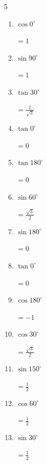 \begin{multicols}{5}
\begin{enumerate}
        $\displaystyle =-\sqrt{3}$

  \item $\displaystyle \cos{0^\circ}$

        $\displaystyle =1$

  \item $\displaystyle \sin{90^\circ}$

        $\displaystyle =1$

\columnbreak %

  \item $\displaystyle \tan{30^\circ}$

        $\displaystyle =\frac{1}{\sqrt{3}}$

  \item $\displaystyle \tan{0^\circ}$

        $\displaystyle =0$

  \item $\displaystyle \tan{180^\circ}$

        $\displaystyle =0$

  \item $\displaystyle \sin{60^\circ}$

        $\displaystyle =\frac{\sqrt{3}}{2}$

  \item $\displaystyle \sin{180^\circ}$

        $\displaystyle =0$

  \item $\displaystyle \tan{0^\circ}$

        $\displaystyle =0$

  \item $\displaystyle \cos{180^\circ}$

        $\displaystyle =-1$

  \item $\displaystyle \cos{30^\circ}$

        $\displaystyle =\frac{\sqrt{3}}{2}$

  \item $\displaystyle \sin{150^\circ}$

        $\displaystyle =\frac{1}{2}$

  \item $\displaystyle \cos{60^\circ}$

        $\displaystyle =\frac{1}{2}$

  \item $\displaystyle \sin{30^\circ}$

        $\displaystyle =\frac{1}{2}$


\end{enumerate}
\end{multicols}
